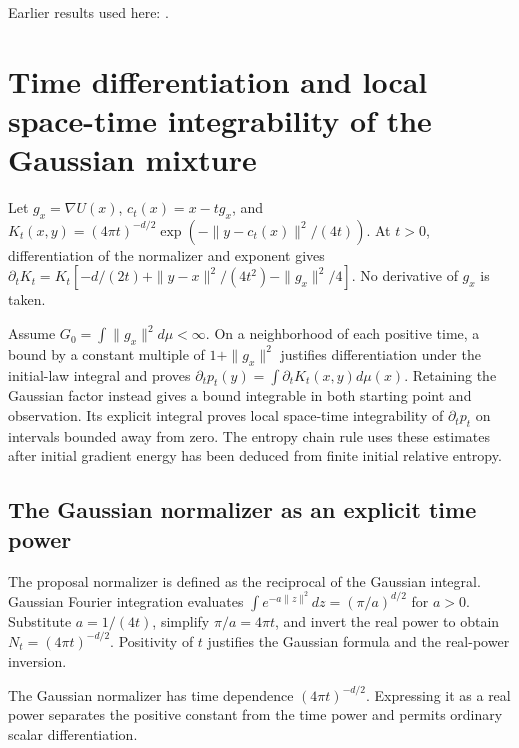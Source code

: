 \documentclass[11pt,a4paper]{report}
\begin{document}
Earlier results used here: \cite[Section~3.26.3]{LangevinLean2026ULASC}.
\section{\texorpdfstring{Time differentiation and local space-time integrability of the Gaussian mixture}{Time differentiation and local space-time integrability of the Gaussian mixture}}
\label{proof-module-UnadjustedLangevin-LSI-GaussianTimeDerivative-lean}


Let \(g_x=\nabla U(x)\), \(c_t(x)=x-tg_x\), and \(K_t(x,y)=(4\pi t)^{-d/2}\exp(-\|y-c_t(x)\|^2/(4t))\). At \(t>0\), differentiation of the normalizer and exponent gives \(\partial_tK_t=K_t[-d/(2t)+\|y-x\|^2/(4t^2)-\|g_x\|^2/4]\). No derivative of \(g_x\) is taken.



Assume \(G_0=\int\|g_x\|^2d\mu<\infty\). On a neighborhood of each positive time, a bound by a constant multiple of \(1+\|g_x\|^2\) justifies differentiation under the initial-law integral and proves \(\partial_tp_t(y)=\int\partial_tK_t(x,y)d\mu(x)\). Retaining the Gaussian factor instead gives a bound integrable in both starting point and observation. Its explicit integral proves local space-time integrability of \(\partial_tp_t\) on intervals bounded away from zero. The entropy chain rule uses these estimates after initial gradient energy has been deduced from finite initial relative entropy.

\subsection{\texorpdfstring{The Gaussian normalizer as an explicit time power}{The Gaussian normalizer as an explicit time power}}
\label{report-step-UnadjustedLangevin-LSI-GaussianTimeDerivative-lean-1}


The proposal normalizer is defined as the reciprocal of the Gaussian integral. Gaussian Fourier integration evaluates \(\int e^{-a\|z\|^2}dz=(\pi/a)^{d/2}\) for \(a>0\). Substitute \(a=1/(4t)\), simplify \(\pi/a=4\pi t\), and invert the real power to obtain \(N_t=(4\pi t)^{-d/2}\). Positivity of \(t\) justifies the Gaussian formula and the real-power inversion.



The Gaussian normalizer has time dependence \((4\pi t)^{-d/2}\). Expressing it as a real power separates the positive constant from the time power and permits ordinary scalar differentiation.
\end{document}
